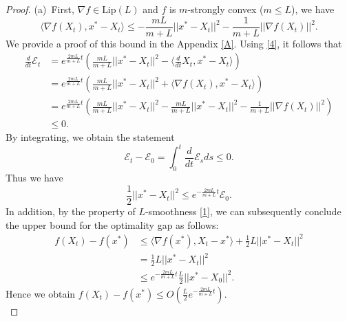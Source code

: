 \documentclass[11pt]{article}
\begin{document}
\begin{proof}
(a)\ First, $\nabla f\in\text{Lip}(L)$ and $f$ is $m$-strongly convex ($m\leq L$), we have
\begin{equation}
    \label{4}
    \langle \nabla f(X_t),x^*-X_t \rangle \leq -\frac{mL}{m+L}||x^*-X_t||^2-\frac{1}{m+L}||\nabla f(X_t)||^2.
\end{equation}
We provide a proof of this bound in the Appendix \ref{A}. Using \eqref{4}, it follows that 
\begin{equation*}
    \begin{aligned}
        \frac{d}{dt}\mathcal{E}_t 
        & = e^{\frac{2mL}{m+L}t}\left(\frac{mL}{m+L}||x^*-X_t||^2-\langle\frac{d}{dt}X_t,x^*-X_t\rangle\right) \\
        & = e^{\frac{2mL}{m+L}t}\left(\frac{mL}{m+L}||x^*-X_t||^2+\langle\nabla f(X_t),x^*-X_t\rangle\right) \\
        & = e^{\frac{2mL}{m+L}t}\left(\frac{mL}{m+L}||x^*-X_t||^2-\frac{mL}{m+L}||x^*-X_t||^2-\frac{1}{m+L}||\nabla f(X_t)||^2\right) \\
        & \leq 0.
    \end{aligned}
\end{equation*}
By integrating, we obtain the statement 
\[
\mathcal{E}_t-\mathcal{E}_0 = \int_{0}^{t}\frac{d}{dt}\mathcal{E}_sds \leq 0.
\]
Thus we have
\[
\frac{1}{2}||x^*-X_t||^2 \leq e^{-\frac{2mL}{m+L}t}\mathcal{E}_0.
\]
In addition, by the property of $L$-smoothness \eqref{1}, we can subsequently conclude the upper bound for the optimality gap as follows:
\begin{equation*}
    \begin{aligned}
        f(X_t)-f(x^*) & \leq \langle\nabla f(x^*),X_t-x^*\rangle+\frac{1}{2}L||x^*-X_t||^2 \\
                      & = \frac{1}{2}L||x^*-X_t||^2 \\
                      & \leq e^{-\frac{2mL}{m+L}t}\frac{L}{2}||x^*-X_0||^2.
    \end{aligned}
\end{equation*}
Hence we obtain $f(X_t)-f(x^*)\leq O(\frac{L}{2}e^{-\frac{2mL}{m+L}t})$.
\\


\end{proof}
\end{document}

